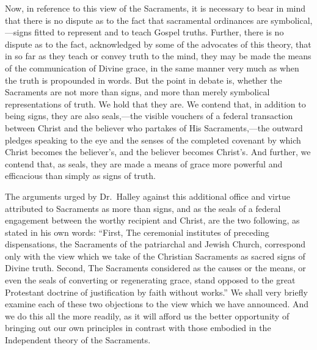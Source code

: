 \documentclass[]{book}
\begin{document}
Now, in reference to this view of the Sacraments, it is necessary to bear in mind that there is no dispute as to the fact that sacramental ordinances are symbolical,---signs fitted to represent and to teach Gospel truths. Further, there is no dispute as to the fact, acknowledged by some of the advocates of this theory, that in so far as they teach or convey truth to the mind, they may be made the means of the communication of Divine grace, in the same manner very much as when the truth is propounded in words. But the point in debate is, whether the Sacraments are not more than signs, and more than merely symbolical representations of truth. We hold that they are. We contend that, in addition to being signs, they are also seals,---the visible vouchers of a federal transaction between Christ and the believer who partakes of His Sacraments,---the outward pledges speaking to the eye and the senses of the completed covenant by which Christ becomes the believer's, and the believer becomes Christ's. And further, we contend that, as seals, they are made a means of grace more powerful and efficacious than simply as signs of truth.

The arguments urged by Dr.~Halley against this additional office and virtue attributed to Sacraments as more than signs, and as the seals of a federal engagement between the worthy recipient and Christ, are the two following, as stated in his own words: ``First, The ceremonial institutes of preceding dispensations, the Sacraments of the patriarchal and Jewish Church, correspond only with the view which we take of the Christian Sacraments as sacred signs of Divine truth. Second, The Sacraments considered as the causes or the means, or even the seals of converting or regenerating grace, stand opposed to the great Protestant doctrine of justification by faith without works.'' We shall very briefly examine each of these two objections to the view which we have announced. And we do this all the more readily, as it will afford us the better opportunity of bringing out our own principles in contrast with those embodied in the Independent theory of the Sacraments.
\end{document}
